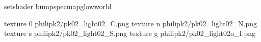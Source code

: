 setshader bumpspecmapglowworld


texture 0 philipk2/pk02_light02_C.png
texture n philipk2/pk02_light02_N.png
texture s philipk2/pk02_light02_S.png
texture g philipk2/pk02_light02o_I.png

